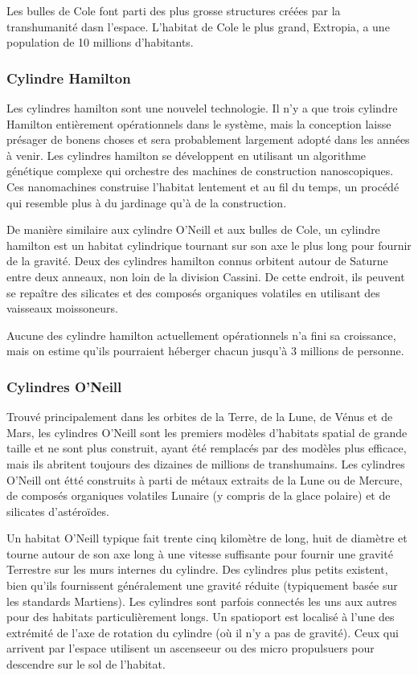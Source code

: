 Les bulles de Cole font parti des plus grosse structures créées par la transhumanité dasn l'espace. L'habitat de Cole le plus grand, Extropia, a une population de 10 millions d'habitants. 

\subsubsection{Cylindre Hamilton} 

Les cylindres hamilton sont une nouvelel technologie. Il n'y a que trois cylindre Hamilton entièrement opérationnels dans le système, mais la conception laisse présager de bonens choses et sera probablement largement adopté dans les années à venir. Les cylindres hamilton se développent en utilisant un algorithme génétique complexe qui orchestre des machines de construction nanoscopiques. Ces nanomachines construise l'habitat lentement et au fil du temps, un procédé qui resemble plus à du jardinage qu'à de la construction. 

De manière similaire aux cylindre O'Neill et aux bulles de Cole, un cylindre hamilton est un habitat cylindrique tournant sur son axe le plus long pour fournir de la gravité. Deux des cylindres hamilton connus orbitent autour de Saturne entre deux anneaux, non loin de la division Cassini. De cette endroit, ils peuvent se repaître des silicates et des composés organiques volatiles en utilisant des vaisseaux moissoneurs. 

Aucune des cylindre hamilton actuellement opérationnels n'a fini sa croissance, mais on estime qu'ils pourraient héberger chacun jusqu'à 3 millions de personne. 

\subsubsection{Cylindres O'Neill} 

Trouvé principalement dans les orbites de la Terre, de la Lune, de Vénus et de Mars, les cylindres O'Neill sont les premiers modèles d'habitats spatial de grande taille et ne sont plus construit, ayant été remplacés par des modèles plus efficace, mais ils abritent toujours des dizaines de millions de transhumains. Les cylindres O'Neill ont étté construits à parti de métaux extraits de la Lune ou de Mercure, de composés organiques volatiles Lunaire (y compris de la glace polaire) et de silicates d'astéroïdes. 

Un habitat O'Neill typique fait trente cinq kilomètre de long, huit de diamètre et tourne autour de son axe long à une vitesse suffisante pour fournir une gravité Terrestre sur les murs internes du cylindre. Des cylindres plus petits existent, bien qu'ils fournissent généralement une gravité réduite (typiquement basée sur les standards Martiens). Les cylindres sont parfois connectés les uns aux autres pour des habitats particulièrement longs. Un spatioport est localisé à l'une des extrémité de l'axe de rotation du cylindre (où il n'y a pas de gravité). Ceux qui arrivent par l'espace utilisent un ascenseeur ou des micro propulsuers pour descendre sur le sol de l'habitat. 



